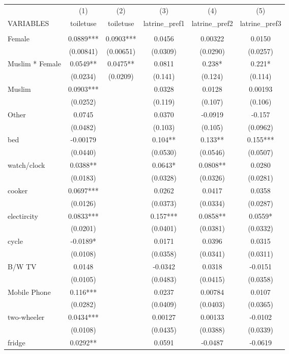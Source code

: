 \documentclass[]{article}
\begin{document}
\begin{tabular}{lccccc} \hline
 & (1) & (2) & (3) & (4) & (5) \\
VARIABLES & toiletuse & toiletuse & latrine\_pref1 & latrine\_pref2 & latrine\_pref3 \\ \hline
 &  &  &  &  &  \\
Female & 0.0889*** & 0.0903*** & 0.0456 & 0.00322 & 0.0150 \\
 & (0.00841) & (0.00651) & (0.0309) & (0.0290) & (0.0257) \\
Muslim * Female & 0.0549** & 0.0475** & 0.0811 & 0.238* & 0.221* \\
 & (0.0234) & (0.0209) & (0.141) & (0.124) & (0.114) \\
Muslim & 0.0903*** &  & 0.0328 & 0.0128 & 0.00193 \\
 & (0.0252) &  & (0.119) & (0.107) & (0.106) \\
Other & 0.0745 &  & 0.0370 & -0.0919 & -0.157 \\
 & (0.0482) &  & (0.103) & (0.105) & (0.0962) \\
bed & -0.00179 &  & 0.104** & 0.133** & 0.155*** \\
 & (0.0440) &  & (0.0530) & (0.0546) & (0.0507) \\
watch/clock & 0.0388** &  & 0.0643* & 0.0808** & 0.0280 \\
 & (0.0183) &  & (0.0328) & (0.0326) & (0.0281) \\
cooker & 0.0697*** &  & 0.0262 & 0.0417 & 0.0358 \\
 & (0.0126) &  & (0.0373) & (0.0334) & (0.0287) \\
electircity & 0.0833*** &  & 0.157*** & 0.0858** & 0.0559* \\
 & (0.0201) &  & (0.0401) & (0.0381) & (0.0332) \\
cycle & -0.0189* &  & 0.0171 & 0.0396 & 0.0315 \\
 & (0.0108) &  & (0.0358) & (0.0341) & (0.0311) \\
B/W TV & 0.0148 &  & -0.0342 & 0.0318 & -0.0151 \\
 & (0.0105) &  & (0.0483) & (0.0415) & (0.0358) \\
Mobile Phone & 0.116*** &  & 0.0237 & 0.00784 & 0.0107 \\
 & (0.0282) &  & (0.0409) & (0.0403) & (0.0365) \\
two-wheeler & 0.0434*** &  & 0.00127 & 0.00133 & -0.0102 \\
 & (0.0108) &  & (0.0435) & (0.0388) & (0.0339) \\
fridge & 0.0292** &  & 0.0591 & -0.0487 & -0.0619 \\

\end{tabular}
\end{document}
